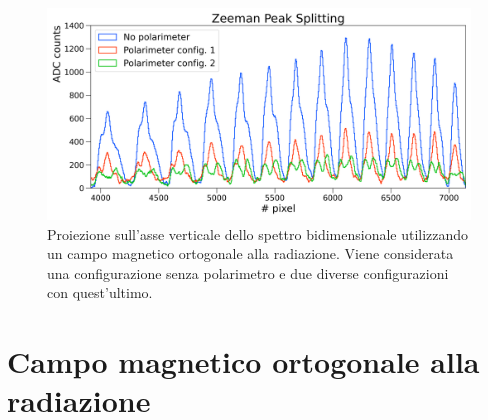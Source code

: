 \documentclass[twocolumn,10pt]{asme2ej}
\begin{document}
\begin{figure}
    \centering
    \includegraphics[width=\linewidth]{../Plots/Bon_overlap_small.png}
    \caption{Proiezione sull'asse verticale dello spettro bidimensionale utilizzando un campo magnetico ortogonale alla
    radiazione. Viene considerata una configurazione senza polarimetro e due diverse configurazioni con quest'ultimo.}
    \label{i:spettro2d_overlap}
    \vspace{-10pt}
\end{figure}





\section{Campo magnetico ortogonale alla radiazione}\label{s:ortogonale}
\end{document}
